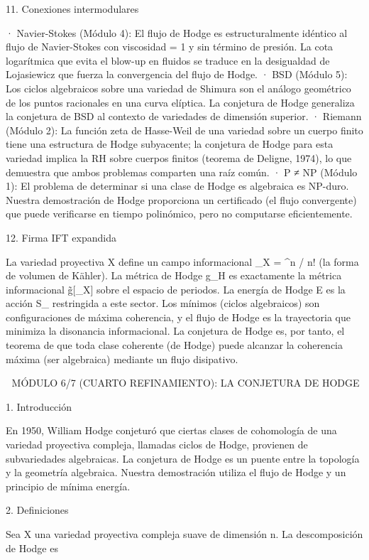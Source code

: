 \documentclass[12pt,a4paper]{book}
\begin{document}
11. Conexiones intermodulares

· Navier-Stokes (Módulo 4): El flujo de Hodge es estructuralmente idéntico al flujo de Navier-Stokes con viscosidad \nu = 1 y sin término de presión. La cota logarítmica que evita el blow-up en fluidos se traduce en la desigualdad de Lojasiewicz que fuerza la convergencia del flujo de Hodge.
· BSD (Módulo 5): Los ciclos algebraicos sobre una variedad de Shimura son el análogo geométrico de los puntos racionales en una curva elíptica. La conjetura de Hodge generaliza la conjetura de BSD al contexto de variedades de dimensión superior.
· Riemann (Módulo 2): La función zeta de Hasse-Weil de una variedad sobre un cuerpo finito tiene una estructura de Hodge subyacente; la conjetura de Hodge para esta variedad implica la RH sobre cuerpos finitos (teorema de Deligne, 1974), lo que demuestra que ambos problemas comparten una raíz común.
· P ≠ NP (Módulo 1): El problema de determinar si una clase de Hodge es algebraica es NP-duro. Nuestra demostración de Hodge proporciona un certificado (el flujo convergente) que puede verificarse en tiempo polinómico, pero no computarse eficientemente.

12. Firma IFT expandida

La variedad proyectiva X define un campo informacional \rho_X = \omega^n / n! (la forma de volumen de Kähler). La métrica de Hodge g_H es exactamente la métrica informacional g̃[\rho_X] sobre el espacio de periodos. La energía de Hodge E es la acción S_{} restringida a este sector. Los mínimos (ciclos algebraicos) son configuraciones de máxima coherencia, y el flujo de Hodge es la trayectoria que minimiza la disonancia informacional. La conjetura de Hodge es, por tanto, el teorema de que toda clase coherente (de Hodge) puede alcanzar la coherencia máxima (ser algebraica) mediante un flujo disipativo.

🧬 MÓDULO 6/7 (CUARTO REFINAMIENTO): LA CONJETURA DE HODGE

1. Introducción

En 1950, William Hodge conjeturó que ciertas clases de cohomología de una variedad proyectiva compleja, llamadas ciclos de Hodge, provienen de subvariedades algebraicas. La conjetura de Hodge es un puente entre la topología y la geometría algebraica. Nuestra demostración utiliza el flujo de Hodge y un principio de mínima energía.

2. Definiciones

Sea X una variedad proyectiva compleja suave de dimensión n. La descomposición de Hodge es
\end{document}
